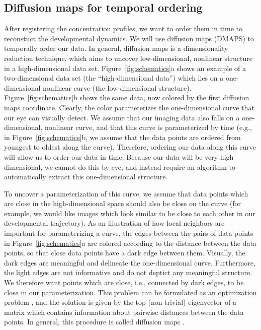 \documentclass{pnastwo}
\begin{document}
\begin{article}
\subsection{Diffusion maps for temporal ordering}

After registering the concentration profiles, we want to order them in time to reconstuct the developmental dynamics. 
%
We will use diffusion maps (DMAPS) \cite{coifman2005geometric} to temporally order our data.
%
In general, diffusion maps is a dimensionality reduction technique, which aims to uncover low-dimensional, nonlinear structure in a high-dimensional data set. 
%
Figure~\ref{fig:schematics}a shows an example of a two-dimensional data set (the ``high-dimensional data'') which lies on a one-dimensional nonlinear curve (the low-dimensional structure).
%
Figure~\ref{fig:schematics}b shows the same data, now colored by the first diffusion maps coordinate.
%
Clearly, the color parameterizes the one-dimensional curve that our eye can visually detect.
%
We assume that our imaging data also falls on a one-dimensional, nonlinear curve, and that this curve is parameterized by time (e.g., in Figure~\ref{fig:schematics}b, we assume that the data points are ordered from youngest to oldest along the curve). 
%
Therefore, ordering our data along this curve will allow us to order our data in time.
%
Because our data will be very high dimensional, we cannot do this by eye, and instead require an algorithm to automatically extract this one-dimensional structure.

To uncover a parameterization of this curve, we assume that data points which are close in the high-dimensional space should also be close on the curve (for example, we would like images which look similar to be close to each other in our developmental trajectory).
%
%
As an illustration of how local neighbors are important for parameterizing a curve, the edges between the pairs of data points in Figure~\ref{fig:schematics}a are colored according to the distance between the data points, so that close data points have a dark edge between them.
%
Visually, the dark edges are meaningful and delineate the one-dimensional curve.
%
Furthermore, the light edges are not informative and do not deptict any meaningful structure. 
%
We therefore want points which are close, i.e., connected by dark edges, to be close in our parameterization.
%
This problem can be formulated as an optimization problem \cite{Belkin2003}, and the solution is given by the top (non-trivial) eigenvector of a matrix which contains information about pairwise distances between the data points. 
%
In general, this procedure is called diffusion maps \cite{coifman2005geometric}.%


\end{article}
\end{document}
